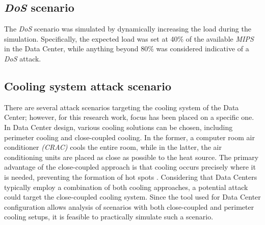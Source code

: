 \subsection{\emph{DoS} scenario}
The \emph{DoS} scenario was simulated by dynamically increasing the load during the simulation. Specifically, the expected load was set at 40\% of the available \emph{MIPS} in the Data Center, while anything beyond 80\% was considered indicative of a \emph{DoS} attack.

\subsection{Cooling system attack scenario} \label{subsection:coolingsystemattack}
There are several attack scenarios targeting the cooling system of the Data Center; however, for this research work, focus has been placed on a specific one. In Data Center design, various cooling solutions can be chosen, including perimeter cooling and close-coupled cooling. In the former, a computer room air conditioner \emph{(CRAC)} cools the entire room, while in the latter, the air conditioning units are placed as close as possible to the heat source. The primary advantage of the close-coupled approach is that cooling occurs precisely where it is needed, preventing the formation of hot spots \cite{anixter}.
Considering that Data Centers typically employ a combination of both cooling approaches, a potential attack could target the close-coupled cooling system. Since the tool used for Data Center configuration allows analysis of scenarios with both close-coupled and perimeter cooling setups, it is feasible to practically simulate such a scenario. 

